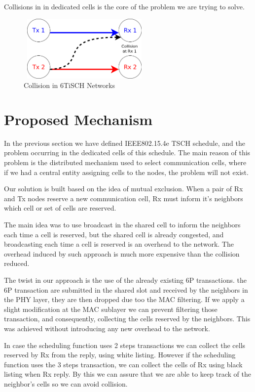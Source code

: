 \documentclass[10pt, conference, compsocconf]{IEEEtran}
\begin{document}
Collisions in in dedicated cells is the core of the problem we are trying to solve. 
\begin{figure}[h]
    \centering
    \includegraphics[width=6.5cm, height=3.2cm]{collision.png}
    \caption{Collision in 6TiSCH Networks}
    \label{fig:Collision in 6TiSCH Networks}
\end{figure}



\section{Proposed Mechanism}

In the previous section we have defined IEEE802.15.4e TSCH schedule, and the problem occurring in the dedicated cells of this schedule. The main reason of this problem is the distributed mechanism used to select communication cells, where if we had a central entity assigning cells to the nodes, the problem will not exist. 

Our solution is built based on the idea of mutual exclusion. When a pair of Rx and Tx nodes reserve a new communication cell, Rx must inform it's neighbors which cell or set of cells are reserved. 

The main idea was to use broadcast in the shared cell to inform the neighbors each time a cell is reserved, but the shared cell is already congested, and broadcasting each time a cell is reserved is an overhead to the network. The overhead induced by such approach is much more expensive than the collision reduced. 

The twist in our approach is the use of the already existing 6P transactions. the 6P transaction are submitted in the shared slot and received by the neighbors in the PHY layer, they are then dropped due too the MAC filtering. If we apply a slight modification at the MAC sublayer we can prevent filtering those transaction, and consequently, collecting the cells reserved by the neighbors. This was achieved without introducing any new overhead to the network. 

In case the scheduling function uses 2 steps transactions we can collect the cells reserved by Rx from the reply, using white listing. However if the scheduling function uses the 3 steps transaction, we can collect the cells of Rx using black listing when Rx reply. By this we can assure that we are able to keep track of the neighbor's cells so we can avoid collision. 
\end{document}
